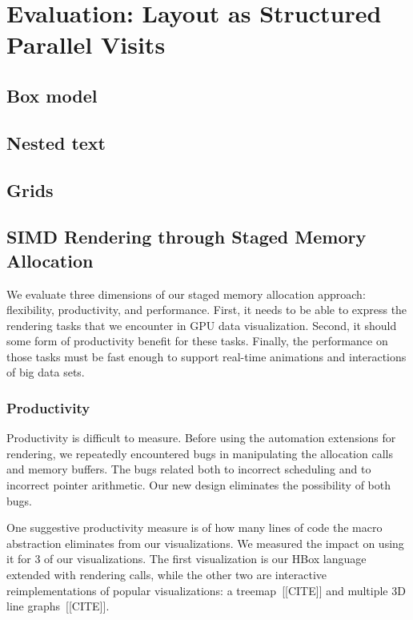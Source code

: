 \section{Evaluation: Layout as Structured Parallel Visits}
\subsection{Box model}
\subsection{Nested text}
\subsection{Grids}


\subsection{SIMD Rendering through Staged Memory Allocation}
We evaluate three dimensions of our staged memory allocation approach: flexibility, productivity, and performance. First, it needs to be able to express the rendering tasks that we encounter in GPU data visualization. Second, it should some form of productivity benefit for these tasks. Finally, the performance on those tasks must be fast  enough to support real-time animations and interactions of big data sets.



\subsubsection{Productivity}
Productivity is difficult to measure. Before using the automation extensions for rendering, we repeatedly encountered bugs in manipulating the allocation calls and memory buffers. The bugs related both to incorrect scheduling and to incorrect pointer arithmetic. Our new design eliminates the possibility of both bugs.

One suggestive productivity measure is of how many lines of code the macro abstraction eliminates from our visualizations. We measured the impact on using it for 3 of our visualizations. The first visualization is our HBox language extended with rendering calls, while the other two are interactive reimplementations of popular visualizations: a treemap~[[CITE]] and multiple 3D line graphs~[[CITE]].


